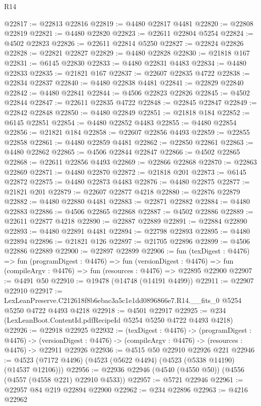 \begin{lexlean}{R14}
\begin{coremodule}
@22817 := @22813 @22816
@22819 := @4480 @22817 @4481
@22820 := @22808 @22819
@22821 := @4480 @22820
@22823 := @22611 @22804 @5254
@22824 := @4502 @22823
@22826 := @22611 @22814 @5250
@22827 := @22824 @22826
@22828 := @22821 @22827
@22829 := @4480 @22828
@22830 := @21818 @167
@22831 := @6145 @22830
@22833 := @4480 @22831 @4483
@22834 := @4480 @22833
@22835 := @21821 @167
@22837 := @22607 @22835 @4722
@22838 := @22834 @22837
@22840 := @4480 @22838 @4481
@22841 := @22829 @22840
@22842 := @4480 @22841
@22844 := @4506 @22823 @22826
@22845 := @4502 @22844
@22847 := @22611 @22835 @4722
@22848 := @22845 @22847
@22849 := @22842 @22848
@22850 := @4480 @22849
@22851 := @21818 @184
@22852 := @6145 @22851
@22854 := @4480 @22852 @4483
@22855 := @4480 @22854
@22856 := @21821 @184
@22858 := @22607 @22856 @4493
@22859 := @22855 @22858
@22861 := @4480 @22859 @4481
@22862 := @22850 @22861
@22863 := @4480 @22862
@22865 := @4506 @22844 @22847
@22866 := @4502 @22865
@22868 := @22611 @22856 @4493
@22869 := @22866 @22868
@22870 := @22863 @22869
@22871 := @4480 @22870
@22872 := @21818 @201
@22873 := @6145 @22872
@22875 := @4480 @22873 @4483
@22876 := @4480 @22875
@22877 := @21821 @201
@22879 := @22607 @22877 @4218
@22880 := @22876 @22879
@22882 := @4480 @22880 @4481
@22883 := @22871 @22882
@22884 := @4480 @22883
@22886 := @4506 @22865 @22868
@22887 := @4502 @22886
@22889 := @22611 @22877 @4218
@22890 := @22887 @22889
@22891 := @22884 @22890
@22893 := @4480 @22891 @4481
@22894 := @22798 @22893
@22895 := @4480 @22894
@22896 := @21821 @126
@22897 := @21705 @22896
@22899 := @4506 @22886 @22889
@22900 := @22897 @22899
@22906 := fun (texDigest : @4476) =>
  fun (programDigest : @4476) =>
  fun (versionDigest : @4476) =>
  fun (compileArgv : @4476) => fun (resources : @4476) => @22895 @22900
@22907 := @4491 @50
@22910 := @19478 (@14748 (@14191 @4499))
@22911 := @22907 @22910
@22917 := LexLeanPreserve.C212618f8b6ebac3a5c1e1dd0896866e7.R14.__fits_0
    @5254
    @5250
    @4722
    @4493
    @4218
@22918 := @4501 @22917
@22925 := @234 (LexLeanBoot.ContentId.pdfRecipeId @5254 @5250 @4722 @4493 @4218)
@22926 := @22918 @22925
@22932 := (texDigest : @4476) ->
  (programDigest : @4476) ->
  (versionDigest : @4476) -> (compileArgv : @4476) -> (resources : @4476) -> @22911 @22926
@22936 := @4515 @50 @22910 @22926 @221
@22946 := @4523 (@7172 @4496) (@4523 (@5622 @4494) (@4523 (@5338 @14190) (@14537 @12106)))
@22956 := @22936 @22946 (@4540 (@4550 @50)) (@4556 (@4557 (@4558 @221) @22910 @4533))
@22957 := @5721 @22946
@22961 := @22957 @84 @219 @22894 @22900
@22962 := @234 @22896
@22963 := @4216 @22962

\end{coremodule}
\end{lexlean}
